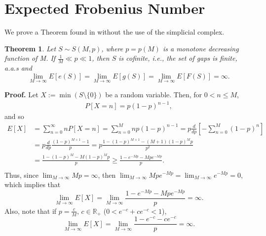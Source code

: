 \documentclass[12pt]{article}
\newtheorem{theorem}{Theorem}[section]
\theoremstyle{definition}
\theoremstyle{remark}
\begin{document}
\section{Expected Frobenius Number}

We prove a Theorem found in \cite{de2017random} without the use of the simplicial complex. 

\begin{theorem}
    Let $S \sim S(M, p)$, where $p = p(M)$ is a monotone decreasing function of M. If $\frac{1}{M} \ll p \ll 1$, then $S$ is cofinite, i.e., the set of gaps is finite, a.a.s and 
\[\lim_{M \to \infty} E[e(S)] = \lim_{M \to \infty} E[g(S)] = \lim_{M \to \infty} E[F(S)] = \infty.\]
\end{theorem}

\textbf{Proof. } Let $X := \min(S \setminus \{0\})$ be a random variable. Then, for $0 < n \leq M$,
\begin{align*}
    P[X = n] = p(1 - p)^{n - 1}, 
\end{align*}
and so 
\begin{align*}
    E[X] &= \sum_{n = 0}^{\infty} nP[X = n] =
    \sum_{n = 0}^{M} np(1 - p)^{n - 1} = p\frac{d}{dp}\left[-\sum_{n = 0}^{M}(1 - p)^n\right]\\
    &=p\frac{d}{dp} \frac{(1 - p)^{M + 1} - 1}{p} = p\frac{1 - (1 - p)^{M + 1} - (M  + 1)(1 - p)^Mp}{p^2} \\
    &= \frac{1 - (1 - p)^{M} - M(1 - p)^Mp}{p} \geq \frac{1 - e^{-Mp} - Mpe^{-Mp}}{p}. \\
\end{align*}
Thus, since $\lim_{M \to \infty} Mp = \infty$, then $\lim_{M \to \infty }Mpe^{-Mp} = \lim_{M \to \infty} e^{-Mp} = 0$, which implies that
\[\lim _{M \to \infty} E[X] = \lim_{M \to \infty} \frac{1 - e^{-Mp} - Mpe^{-Mp}}{p} = \infty.\]
Also, note that if $p = \frac{c}{M}$, $c \in \mathbb{R_+}$ ($0 < e^{-c} + ce^{-c} < 1$),
\[\lim _{M \to \infty} E[X] = \lim_{M \to \infty} \frac{1 - e^{-c} - ce^{-c}}{p} = \infty.\]



\end{document}

